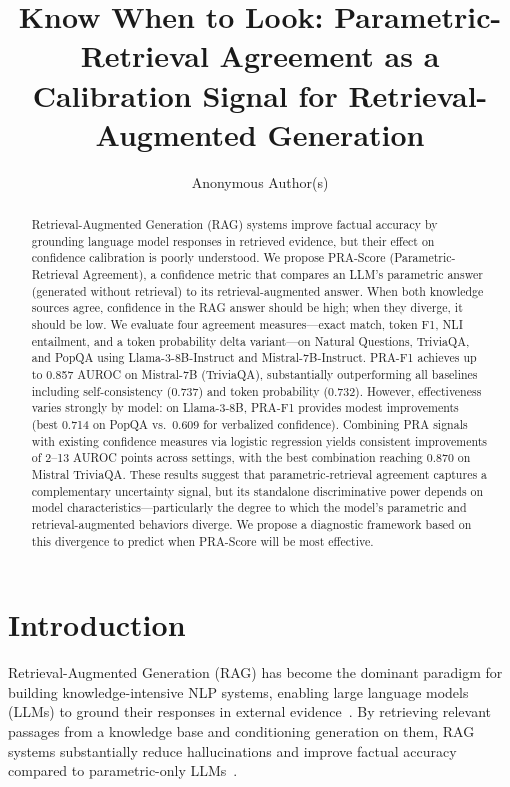 \documentclass{article}
\title{Know When to Look: Parametric-Retrieval Agreement as a Calibration Signal for Retrieval-Augmented Generation}
\author{
  Anonymous Author(s)
}
\begin{document}
\maketitle

\begin{abstract}
Retrieval-Augmented Generation (RAG) systems improve factual accuracy by grounding language model responses in retrieved evidence, but their effect on confidence calibration is poorly understood. We propose PRA-Score (Parametric-Retrieval Agreement), a confidence metric that compares an LLM's parametric answer (generated without retrieval) to its retrieval-augmented answer. When both knowledge sources agree, confidence in the RAG answer should be high; when they diverge, it should be low. We evaluate four agreement measures---exact match, token F1, NLI entailment, and a token probability delta variant---on Natural Questions, TriviaQA, and PopQA using Llama-3-8B-Instruct and Mistral-7B-Instruct. PRA-F1 achieves up to 0.857 AUROC on Mistral-7B (TriviaQA), substantially outperforming all baselines including self-consistency (0.737) and token probability (0.732). However, effectiveness varies strongly by model: on Llama-3-8B, PRA-F1 provides modest improvements (best 0.714 on PopQA vs.\ 0.609 for verbalized confidence). Combining PRA signals with existing confidence measures via logistic regression yields consistent improvements of 2--13 AUROC points across settings, with the best combination reaching 0.870 on Mistral TriviaQA. These results suggest that parametric-retrieval agreement captures a complementary uncertainty signal, but its standalone discriminative power depends on model characteristics---particularly the degree to which the model's parametric and retrieval-augmented behaviors diverge. We propose a diagnostic framework based on this divergence to predict when PRA-Score will be most effective.
\end{abstract}

\section{Introduction}

Retrieval-Augmented Generation (RAG) has become the dominant paradigm for building knowledge-intensive NLP systems, enabling large language models (LLMs) to ground their responses in external evidence~\citep{lewis2020rag}. By retrieving relevant passages from a knowledge base and conditioning generation on them, RAG systems substantially reduce hallucinations and improve factual accuracy compared to parametric-only LLMs~\citep{guu2020realm}.
\end{document}
